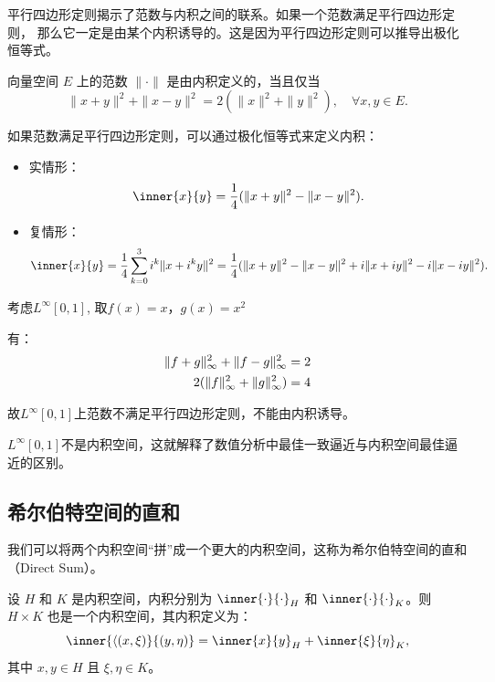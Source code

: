 平行四边形定则揭示了范数与内积之间的联系。如果一个范数满足平行四边形定则，
那么它一定是由某个内积诱导的。这是因为平行四边形定则可以推导出极化恒等式。

\begin{theorem}
    向量空间 \(E\) 上的范数 \(\|\cdot\|\) 是由内积定义的，当且仅当
    \[
        \|x+y\|^2 + \|x-y\|^2 = 2(\|x\|^2 + \|y\|^2), \quad \forall x, y \in E.
    \]
\end{theorem}

如果范数满足平行四边形定则，可以通过极化恒等式来定义内积：
\begin{itemize}
    \item 实情形：
        \[
            \inner{x}{y} = \frac{1}{4} (\|x+y\|^2 - \|x-y\|^2).
        \]
    \item 复情形：
        \[
            \inner{x}{y} = \frac{1}{4} \sum_{k=0}^3 i^k \|x +
            i^k y\|^2 = \frac{1}{4} (\|x+y\|^2 - \|x-y\|^2 +
            i\|x+iy\|^2 - i\|x-iy\|^2).
        \]
\end{itemize}

\begin{example}
    考虑\(L^{\infty }[0,1] \), 取\(f(x)= x\)，\(g(x)= x^2\)

    有：
    \begin{align*}
        \lVert f+g\rVert_{\infty }^{2} + \lVert f-g\rVert_{\infty }^{2} &= 2 \\
        2(\lVert f\rVert_{\infty }^{2} + \lVert g\rVert_{\infty }^{2}) &= 4
    \end{align*}

    故\(L^{\infty }[0,1] \)上范数不满足平行四边形定则，不能由内积诱导。

    \(L^{\infty }[0,1] \)不是内积空间，这就解释了数值分析中最佳一致逼近与内积空间最佳逼近的区别。
\end{example}

\subsection{希尔伯特空间的直和}

我们可以将两个内积空间“拼”成一个更大的内积空间，这称为希尔伯特空间的直和（Direct Sum）。

\begin{example}
    设 \(H\) 和 \(K\) 是内积空间，内积分别为 \(\inner{\cdot}{\cdot}_H\) 和
    \(\inner{\cdot}{\cdot}_K\)。则 \(H \times K\) 也是一个内积空间，其内积定义为：
    \[
        \inner{\langle (x, \xi)}{(y, \eta)}= \inner{x}{y}_H
        + \inner{\xi}{\eta}_K,
    \]
    其中 \(x, y \in H\) 且 \(\xi, \eta \in K\)。
\end{example}

